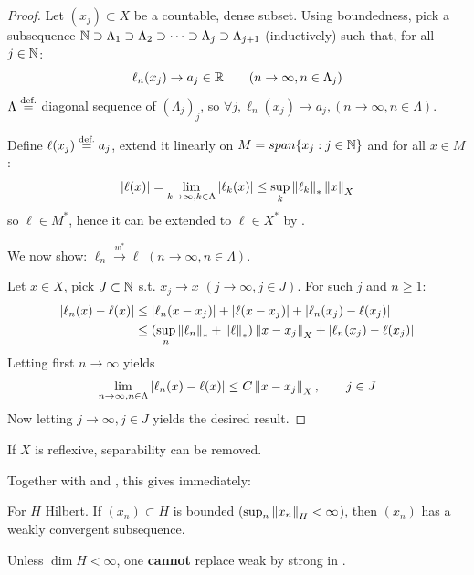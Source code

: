 \documentclass{article}
\begin{document}
\begin{proof}
    Let $(x_j) \subset X$ be a countable, dense subset. Using boundedness, pick a subsequence $\mathbb{N} \supset \Lambda_1 \supset \Lambda_2 \supset \cdots \supset \Lambda_j \supset \Lambda_{j+1}$ (inductively) such that, for all $j \in \mathbb{N}$:  
    $$
    \ell_n (x_j) \to a_j \in \mathbb{R} \qquad (n \to \infty, n\in \Lambda_j)
    $$  
    $\Lambda \stackrel{\text{def.}}{=}$ diagonal sequence of $(\Lambda_j)_j$, so $\forall j, \ell_n(x_j) \to a_j, (n\to \infty, n\in \Lambda)$. 
    
    Define $\ell(x_j) \stackrel{\text{def.}}{=} a_j$, extend it linearly on $M = span \{x_j: j\in \mathbb{N}\}$ and for all $x\in M$:  
    $$
    |\ell(x)| = \lim_{k\to \infty, k\in \Lambda} |\ell_k(x)| \leq \sup_k \left\|{\ell_k}\right\|_* \left\|{x}\right\|_{X}
    $$
    so $\ell \in M^*$, hence it can be extended to $\ell \in X^*$ by .  

    We now show: $\ell_n \overset{w^*}{\rightarrow} \ell$ $(n \to \infty, n \in \Lambda)$. 
    
    Let $x\in X$, pick $J \subset \mathbb{N}$ s.t. $x_j \to x$ $(j\to \infty, j \in J)$. For such $j$ and $n\geq 1$:  
    \begin{align*}
        |\ell_n(x)-\ell(x)| &\leq |\ell_n(x-x_j)| + |\ell(x-x_j)| + |\ell_n(x_j)-\ell(x_j)| \\
        &\leq (\sup_n \left\|{\ell_n}\right\|_* + \left\|{\ell}\right\|_*) \left\|{x-x_j}\right\|_X + |\ell_n(x_j)-\ell(x_j)|
    \end{align*}
    Letting first $n\to \infty$ yields  
    $$
    \lim_{n\to \infty, n\in \Lambda} |\ell_n(x)-\ell(x)| \leq C \left\|{x-x_j}\right\|_X, \qquad j \in J
    $$  
    Now letting $j\to \infty, j\in J$ yields the desired result.
\end{proof}  

\begin{remark}
\label{remark: reflexivity in Banach Alaoglu}
    If $X$ is reflexive, separability can be removed. 
\end{remark}

Together with  and , this gives immediately:

\begin{corollary}
\label{corollary: hilbert weak convergence}
For $H$ Hilbert. If $(x_n) \subset H$ is bounded ($\sup_n \left\|{x_n}\right\|_H < \infty$), then $(x_n)$ has a weakly convergent subsequence. 
\end{corollary}

Unless $\dim H<\infty$, one \textbf{cannot} replace weak by strong in .
\end{document}
